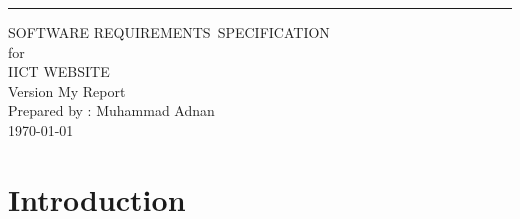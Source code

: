 \documentclass{scrreprt}
\date{}
\def\myversion{My Report}
\begin{document}
    
    \begin{flushright}
        \rule{16cm}{5pt}\vskip1cm
        \begin{bfseries}
            \Huge{SOFTWARE REQUIREMENTS\ SPECIFICATION}\
            \vspace{1.5cm} 
            \\for\\
            \vspace{1.5cm}
            IICT WEBSITE\\
            \vspace{1.5cm}
            \LARGE{Version \myversion}\\
            \vspace{1.5cm}
            Prepared by : Muhammad Adnan\\ 
            \vspace{1.5cm}
            \today\
        \end{bfseries}
    \end{flushright}
    
    
    \tableofcontents
    
    \chapter{Introduction} 
\end{document}
